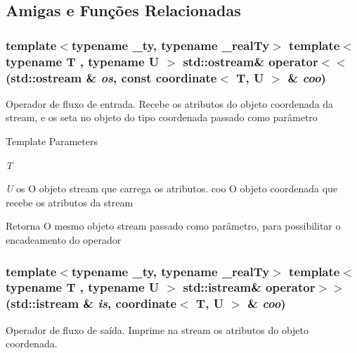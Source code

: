 \subsection{Amigas e Funções Relacionadas}
\hypertarget{classcoordinate_ac6da0a94290e6364c27e4dff1a52f5e5}{
\subsubsection[{operator$<$$<$}]{\setlength{\rightskip}{0pt plus 5cm}template$<$typename \_\-ty, typename \_\-realTy$>$ template$<$typename T , typename U $>$ std::ostream\& operator$<$$<$ (std::ostream \& {\em os}, \/  const {\bf coordinate}$<$ T, U $>$ \& {\em coo})}}
\label{classcoordinate_ac6da0a94290e6364c27e4dff1a52f5e5}
Operador de fluxo de entrada. Recebe os atributos do objeto coordenada da stream, e os seta no objeto do tipo coordenada passado como parâmetro


\begin{DoxyTemplParams}{Template Parameters}
\item[{\em T}]\item[{\em U}]os O objeto stream que carrega os atributos.  coo O objeto coordenada que recebe os atributos da stream\end{DoxyTemplParams}
\begin{DoxyReturn}{Retorna}
O mesmo objeto stream passado como parâmetro, para possibilitar o encadeamento do operador 
\end{DoxyReturn}
\hypertarget{classcoordinate_aacb2e8f6ef327786248a961828b53fa5}{
\subsubsection[{operator$>$$>$}]{\setlength{\rightskip}{0pt plus 5cm}template$<$typename \_\-ty, typename \_\-realTy$>$ template$<$typename T , typename U $>$ std::istream\& operator$>$$>$ (std::istream \& {\em is}, \/  {\bf coordinate}$<$ T, U $>$ \& {\em coo})}}
\label{classcoordinate_aacb2e8f6ef327786248a961828b53fa5}
Operador de fluxo de saída. Imprime na stream os atributos do objeto coordenada.


